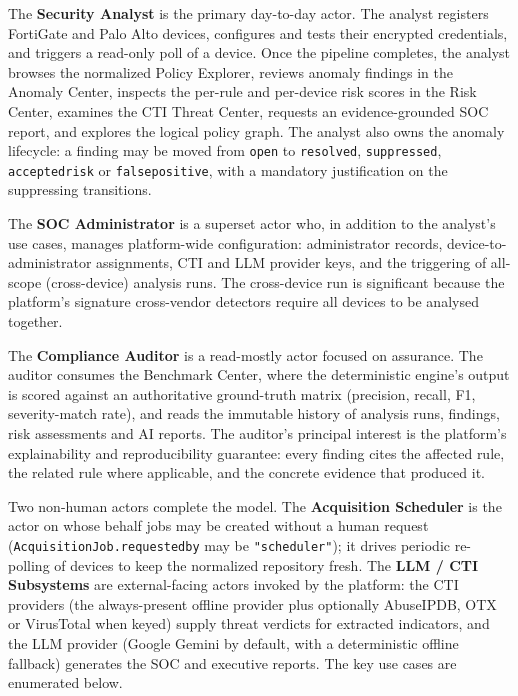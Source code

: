 \documentclass[12pt,a4paper]{report}
\renewcommand{\_}{\textunderscore\allowbreak}
\begin{document}
The \textbf{Security Analyst} is the primary day-to-day actor. The analyst registers FortiGate and Palo Alto devices, configures and tests their encrypted credentials, and triggers a read-only poll of a device. Once the pipeline completes, the analyst browses the normalized Policy Explorer, reviews anomaly findings in the Anomaly Center, inspects the per-rule and per-device risk scores in the Risk Center, examines the CTI Threat Center, requests an evidence-grounded SOC report, and explores the logical policy graph. The analyst also owns the anomaly lifecycle: a finding may be moved from \texttt{open} to \texttt{resolved}, \texttt{suppressed}, \texttt{accepted\_risk} or \texttt{false\_positive}, with a mandatory justification on the suppressing transitions.

The \textbf{SOC Administrator} is a superset actor who, in addition to the analyst's use cases, manages platform-wide configuration: administrator records, device-to-administrator assignments, CTI and LLM provider keys, and the triggering of all-scope (cross-device) analysis runs. The cross-device run is significant because the platform's signature cross-vendor detectors require all devices to be analysed together.

The \textbf{Compliance Auditor} is a read-mostly actor focused on assurance. The auditor consumes the Benchmark Center, where the deterministic engine's output is scored against an authoritative ground-truth matrix (precision, recall, F1, severity-match rate), and reads the immutable history of analysis runs, findings, risk assessments and AI reports. The auditor's principal interest is the platform's explainability and reproducibility guarantee: every finding cites the affected rule, the related rule where applicable, and the concrete evidence that produced it.

Two non-human actors complete the model. The \textbf{Acquisition Scheduler} is the actor on whose behalf jobs may be created without a human request (\texttt{AcquisitionJob.requested\_by} may be \texttt{"scheduler"}); it drives periodic re-polling of devices to keep the normalized repository fresh. The \textbf{LLM / CTI Subsystems} are external-facing actors invoked by the platform: the CTI providers (the always-present offline provider plus optionally AbuseIPDB, OTX or VirusTotal when keyed) supply threat verdicts for extracted indicators, and the LLM provider (Google Gemini by default, with a deterministic offline fallback) generates the SOC and executive reports. The key use cases are enumerated below.
\end{document}
